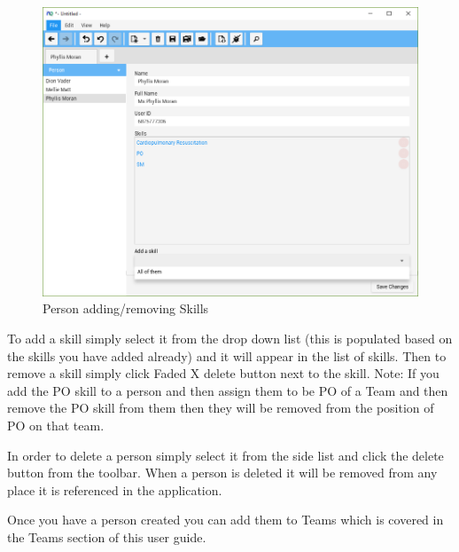 \begin{figure}[H]
	\centering
	\includegraphics[width=\textwidth]{images/screenshots/people3.PNG}
	\caption{Person adding/removing Skills}
	\label{fig:new_project}
\end{figure}

To add a skill simply select it from the drop down list (this is populated based on the skills you have added already) and it will appear in the list of skills. Then to remove a skill simply click Faded X delete button next to the skill. Note: If you add the PO skill to a person and then assign them to be PO of a Team and then remove the PO skill from them then they will be removed from the position of PO on that team.

In order to delete a person simply select it from the side list and click the delete button from the toolbar. When a person is deleted it will be removed from any place it is referenced in the application.

Once you have a person created you can add them to Teams which is covered in the Teams section of this user guide.